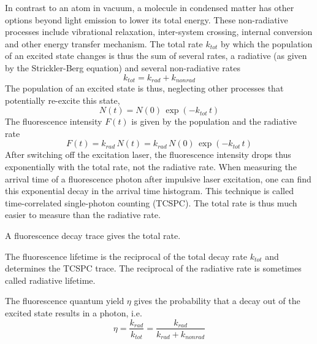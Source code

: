 In contrast to an atom in vacuum, a molecule in condensed matter has other options beyond light emission to lower its total energy. These non-radiative processes include vibrational relaxation, inter-system crossing, internal conversion and other energy transfer mechanism. The total rate $k_{tot}$ by which the population of an excited state changes is thus the sum of several rates, a radiative  (as given by the Strickler-Berg equation) and several non-radiative rates 
\begin{equation}
 k_{tot} = k_{rad} + k_{non rad} 
\end{equation}
%
The population of an excited state is thus, neglecting other processes that  potentially re-excite this state,
\begin{equation}
 N(t) = N(0) \, \exp \left( - k_{tot}  \,t \right)
\end{equation}
The fluorescence intensity $F(t)$ is given by the population and the radiative rate
\begin{equation}
 F(t) = k_{rad} \, N(t) = k_{rad} \,  N(0) \, \exp \left( - k_{tot} \, t \right)
\end{equation}
After switching off the excitation laser, the fluorescence intensity drops thus exponentially with the total rate, not the radiative rate. When measuring the arrival time of a fluorescence photon after impulsive laser excitation, one can find this exponential decay in the arrival time histogram. This technique is called time-correlated single-photon counting (TCSPC). The total rate is thus much easier to measure than the radiative rate. 


\begin{marginfigure}

  \caption{A fluorescence decay trace gives the total rate.}
\end{marginfigure}


The fluorescence lifetime is the reciprocal of the total decay rate $k_{tot}$ and determines the TCSPC trace. The reciprocal of the radiative rate is sometimes called radiative lifetime.

The fluorescence quantum yield $\eta$ gives the probability that a decay out of the excited state results in a photon, i.e.
\begin{equation}
 \eta   = \frac{k_{rad}}{k_{tot}} = \frac{k_{rad}}{k_{rad} + k_{non rad}}
\end{equation}














\printbibliography[segment=\therefsegment,heading=subbibliography]
